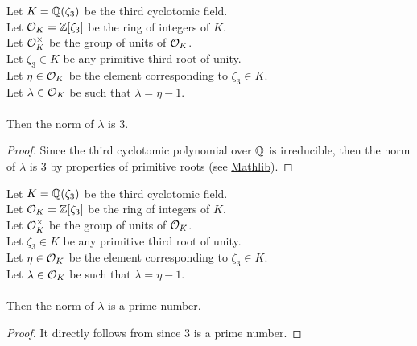 \begin{lemma}
    \label{lmm:norm_lambda}
    \leanok
    Let $K = \mathbb{Q}(\zeta_3)$ be the third cyclotomic field. \\
    Let $\mathcal{O}_K = \mathbb{Z}[\zeta_3]$ be the ring of integers of $K$. \\
    Let $\mathcal{O}^\times_K$ be the group of units of $\mathcal{O}_K$. \\
    Let $\zeta_3 \in K$ be any primitive third root of unity. \\
    Let $\eta \in \mathcal{O}_K$ be the element corresponding to $\zeta_3 \in K$. \\
    Let $\lambda \in \mathcal{O}_K$ be such that $\lambda = \eta -1$. \\\\
    Then the norm of $\lambda$ is $3$.
\end{lemma}
\begin{proof}
    \leanok
    Since the third cyclotomic polynomial over $\mathbb{Q}$ is irreducible, then the norm of $\lambda$ is $3$
    by properties of primitive roots (see \href{https://pitmonticone.github.io/FLT3/docs/Mathlib/NumberTheory/Cyclotomic/PrimitiveRoots.html#IsPrimitiveRoot.sub_one_norm_prime}{Mathlib}).
\end{proof}

\begin{lemma}
    \label{lmm:norm_lambda_prime}
    \leanok
    Let $K = \mathbb{Q}(\zeta_3)$ be the third cyclotomic field. \\
    Let $\mathcal{O}_K = \mathbb{Z}[\zeta_3]$ be the ring of integers of $K$. \\
    Let $\mathcal{O}^\times_K$ be the group of units of $\mathcal{O}_K$. \\
    Let $\zeta_3 \in K$ be any primitive third root of unity. \\
    Let $\eta \in \mathcal{O}_K$ be the element corresponding to $\zeta_3 \in K$. \\
    Let $\lambda \in \mathcal{O}_K$ be such that $\lambda = \eta -1$. \\\\
    Then the norm of $\lambda$ is a prime number.
\end{lemma}
\begin{proof}
    \leanok
    It directly follows from  since $3$ is a prime number.
\end{proof}

